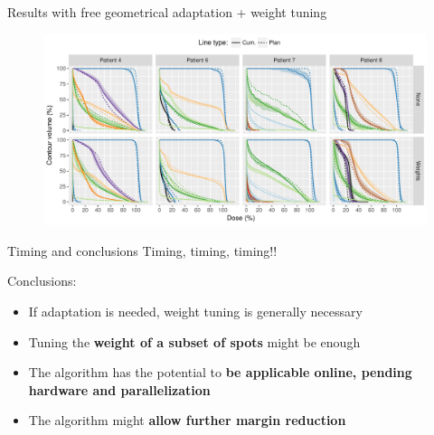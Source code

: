 \documentclass[pdf,dvipsnames,aspectratio=169]{beamer}
\begin{document}
\begin{frame}[c]{Results with free geometrical adaptation + weight tuning}
    \begin{figure}[b!]
        \centering
        \includegraphics[width=\textwidth]{imgs/adapted_cumulative_DVHs.pdf}
    \end{figure}
\end{frame}


\begin{frame}[c]{Timing and conclusions}
    Timing, timing, timing!!
    \begin{table}[h]
        \caption{Current and expected times (s)}
    \end{table}
    \pause

    Conclusions:
    \begin{itemize}
        \item If adaptation is needed, weight tuning is generally necessary
        \item Tuning the \textbf{weight of a subset of spots} might be enough
        \item The algorithm has the potential to \textbf{be applicable online, pending hardware and parallelization}
        \item The algorithm might \textbf{allow further margin reduction}
    \end{itemize}
\end{frame}
\end{document}

